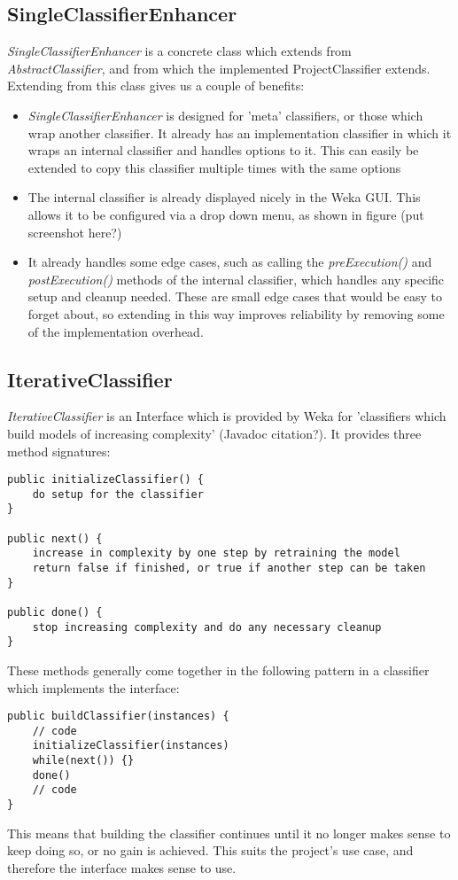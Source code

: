 \subsection{SingleClassifierEnhancer}
\textit{SingleClassifierEnhancer} is a concrete class which extends from \textit{AbstractClassifier}, and from which the implemented ProjectClassifier extends. Extending from this class gives us a couple of benefits:
\begin{itemize}
\item \textit{SingleClassifierEnhancer} is designed for 'meta' classifiers, or those which wrap another classifier. It already has an implementation classifier in which it wraps an internal classifier and handles options to it. This can easily be extended to copy this classifier multiple times with the same options
\item The internal classifier is already displayed nicely in the Weka GUI. This allows it to be configured via a drop down menu, as shown in figure (put screenshot here?)
\item It already handles some edge cases, such as calling the \textit{preExecution()} and \textit{postExecution()} methods of the internal classifier, which handles any specific setup and cleanup needed. These are small edge cases that would be easy to forget about, so extending in this way improves reliability by removing some of the implementation overhead.
\end{itemize}

\subsection{IterativeClassifier}
\textit{IterativeClassifier} is an Interface which is provided by Weka for 'classifiers which build models of increasing complexity' (Javadoc citation?). It provides three method signatures: 
\begin{footnotesize}
\begin{verbatim}
public initializeClassifier() {
    do setup for the classifier
}

public next() {
    increase in complexity by one step by retraining the model
    return false if finished, or true if another step can be taken
}

public done() {
    stop increasing complexity and do any necessary cleanup
}
\end{verbatim}
\end{footnotesize}
These methods generally come together in the following pattern in a classifier which implements the interface:
\begin{footnotesize}
\begin{verbatim}
public buildClassifier(instances) {
    // code
    initializeClassifier(instances)
    while(next()) {}
    done()
    // code
}
\end{verbatim}
\end{footnotesize}
This means that building the classifier continues until it no longer makes sense to keep doing so, or no gain is achieved. This suits the project's use case, and therefore the interface makes sense to use.

